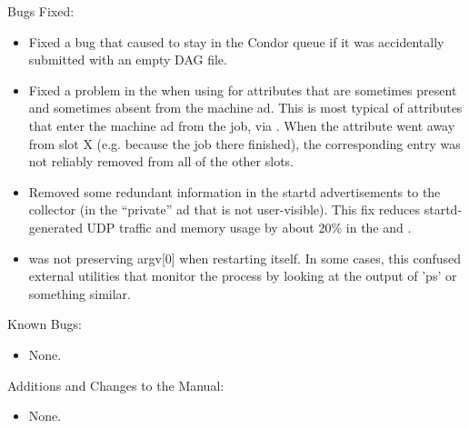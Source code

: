 \noindent Bugs Fixed:

\begin{itemize}

\item Fixed a bug that caused  to stay in the Condor
queue if it was accidentally submitted with an empty DAG file.

\item Fixed a problem in the  when using
 for attributes that are sometimes
present and sometimes absent from the machine ad.  This is most
typical of attributes that enter the machine ad from the job, via
.  When the attribute went away from slot
X (e.g. because the job there finished), the corresponding
 entry was not reliably removed from
all of the other slots.

\item Removed some redundant information in the startd advertisements
to the collector (in the ``private'' ad that is not user-visible).
This fix reduces startd-generated UDP traffic and memory usage by
about 20\% in the  and .

\item {} was not preserving argv[0] when restarting
itself.  In some cases, this confused external utilities that monitor
the  process by looking at the output of 'ps' or
something similar.

\end{itemize}

\noindent Known Bugs:

\begin{itemize}

\item None.

\end{itemize}

\noindent Additions and Changes to the Manual:

\begin{itemize}

\item None.

\end{itemize}

